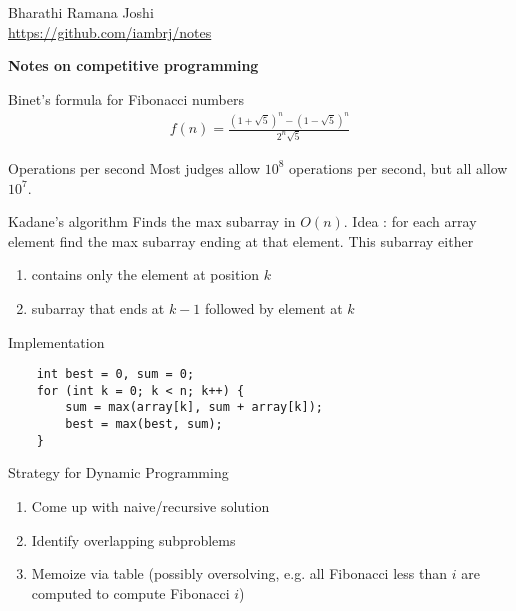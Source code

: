\documentclass[titlepage, 12pt]{article}
\begin{document}
\begin{titlepage}

	\raggedleft

	\vspace*{\baselineskip}

	{Bharathi Ramana Joshi\\\url{https://github.com/iambrj/notes}}

	\vspace*{0.167\textheight}

	\textbf{\LARGE Notes on competitive programming}\\[\baselineskip]

	\vfill

	\vspace*{3\baselineskip}

\end{titlepage}

\newpage

\begin{definition}{Binet's formula for Fibonacci numbers}{}
    \begin{align*}
        f(n) = \frac{(1 + \sqrt{5}) ^ n - (1 - \sqrt{5}) ^ n}{2^n\sqrt{5}}
    \end{align*}
\end{definition}

\begin{definition}{Operations per second}{}
    Most judges allow $10^8$ operations per second, but all allow $10^7$.
\end{definition}

\begin{algorithm}{Kadane's algorithm}{}
    Finds the max subarray in $O(n)$. Idea : for each array element find the max
    subarray ending at that element. This subarray either
    \begin{enumerate}
        \item contains only the element at position $k$
        \item subarray that ends at $k - 1$ followed by element at $k$
    \end{enumerate}
    Implementation
    \begin{verbatim}
    int best = 0, sum = 0;
    for (int k = 0; k < n; k++) {
        sum = max(array[k], sum + array[k]);
        best = max(best, sum);
    }
    \end{verbatim}
\end{algorithm}

\begin{definition}{Strategy for Dynamic Programming}{}
    \begin{enumerate}
        \item Come up with naive/recursive solution
        \item Identify overlapping subproblems
        \item Memoize via table (possibly oversolving, e.g. all Fibonacci less
            than $i$ are computed to compute Fibonacci $i$)
    \end{enumerate}
\end{definition}
\end{document}

